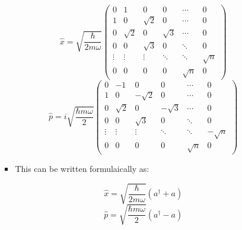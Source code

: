 \begin{itemize}
\begin{itemize}
\begin{itemize}
            $$\hat{x}=\sqrt{\frac{\hbar}{2m\omega}}\left( \begin{matrix} 0 & 1 & 0 & 0 & \cdots & 0\\ 1 & 0 & \sqrt{2} & 0 & \cdots & 0\\ 0 & \sqrt{2} & 0 & \sqrt{3} & \cdots & 0\\ 0 & 0 & \sqrt{3} & 0 & \ddots & 0\\ \vdots & \vdots & \vdots & \ddots & \ddots & \sqrt{n}\\ 0 & 0 & 0 & 0 & \sqrt{n} & 0\end{matrix}\right)$$
            $$\hat{p}=i\sqrt{\frac{\hbar m\omega}{2}}\left( \begin{matrix} 0 & -1 & 0 & 0 & \cdots & 0\\ 1 & 0 & -\sqrt{2} & 0 & \cdots & 0\\ 0 & \sqrt{2} & 0 & -\sqrt{3} & \cdots & 0\\ 0 & 0 & \sqrt{3} & 0 & \ddots & 0\\ \vdots & \vdots & \vdots & \ddots & \ddots & -\sqrt{n}\\ 0 & 0 & 0 & 0 & \sqrt{n} & 0\end{matrix}\right)$$

          \item This can be written formulaically as:

            $$\hat{x}=\sqrt{\frac{\hbar}{2m\omega}}(a^{\dagger}+a)$$
            $$\hat{p}=\sqrt{\frac{\hbar m\omega}{2}}(a^{\dagger}-a)$$

        \end{itemize}

    \end{itemize}

\end{itemize}



